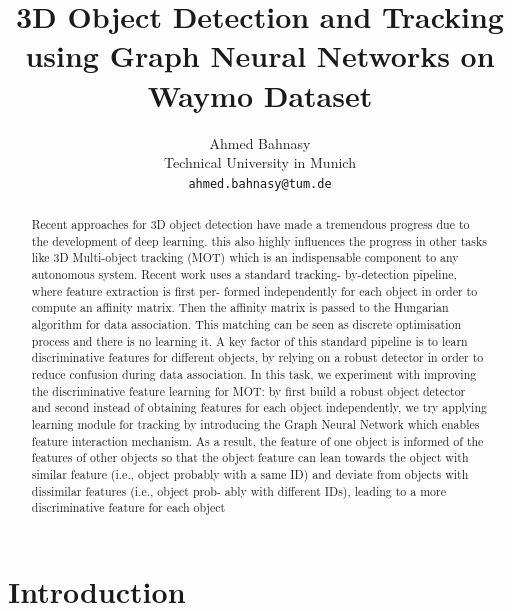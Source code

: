 \documentclass[10pt,twocolumn,letterpaper]{article}
\begin{document}
\title{3D Object Detection and Tracking using Graph Neural Networks on Waymo Dataset}

\author{Ahmed Bahnasy\\
Technical University in Munich\\

{\tt\small ahmed.bahnasy@tum.de}
}

\maketitle

\begin{abstract}
Recent approaches for 3D object detection have made a tremendous progress due to the development of deep learning. this also highly influences the  progress in other tasks like 3D Multi-object tracking (MOT) which is an indispensable component to any autonomous system. Recent work uses a standard tracking- by-detection pipeline, where feature extraction is first per- formed independently for each object in order to compute an affinity matrix. Then the affinity matrix is passed to the Hungarian algorithm for data association. This matching can be seen as discrete optimisation process and there is no learning it. A key factor of this standard pipeline is to learn discriminative features for different objects, by relying on a robust detector in order to reduce confusion during data association. In this task, we experiment with improving the discriminative feature learning for MOT: by first build a robust object detector and second instead of obtaining features for each object independently, we try applying learning module for tracking by introducing the Graph Neural Network which enables feature interaction mechanism. As a result, the feature of one object is informed of the features of other objects so that the object feature can lean towards the object with similar feature (i.e., object probably with a same ID) and deviate from objects with dissimilar features (i.e., object prob- ably with different IDs), leading to a more discriminative feature for each object
\end{abstract}

\section{Introduction}
\end{document}
